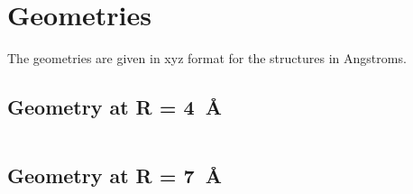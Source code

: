 \section{Geometries}
The geometries are given in xyz format for the  structures in Angstroms.
\subsection{Geometry at R = \SI{4}{\angstrom}}
\inputminted{md}{parts/water4_4A.xyz}
\subsection{Geometry at R = \SI{7}{\angstrom}}
\inputminted{md}{parts/water4_7A.xyz}
\newpage

